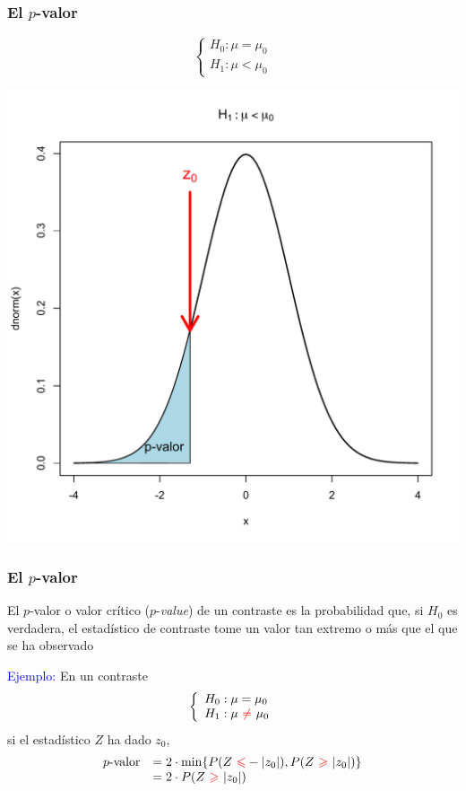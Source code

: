 \documentclass[12pt,t]{beamer}\usepackage[]{graphicx}\usepackage[]{color}
\newcommand{\red}[1]{\textcolor{red}{#1}}
\newcommand{\blue}[1]{\textcolor{blue}{#1}}
\renewcommand{\emph}[1]{{\color{red}#1}}
\renewcommand{\leq}{\leqslant}
\renewcommand{\geq}{\geqslant}
\theoremstyle{plain}
\theoremstyle{definition}
\begin{document}
\begin{frame}
\frametitle{El $p$-valor}
\vspace*{-0.75cm}

$$
\left\{\begin{array}{l}
H_{0}:\mu=\mu_{0}\\ H_{1}:\mu<\mu_{0}
\end{array}
\right.
$$
\begin{center}
\includegraphics[width=0.7\linewidth]{pvalor10.pdf}
\end{center}

\end{frame}


\begin{frame}
\frametitle{El $p$-valor}

El  \emph{$p$-valor} o  \emph{valor crítico}  ($p$-\textsl{value}) de un contraste es la probabilidad que, si $H_0$ es verdadera, el estadístico de contraste tome un valor tan extremo o  más que el que se ha observado
\medskip

\blue{Ejemplo:} En un contraste
$$
\left\{\begin{array}{l}
H_{0}:\mu=\mu_{0}\\ H_{1}:\mu\ \red{\neq}\ \mu_{0}
\end{array}
\right.
$$
si el estadístico $Z$ ha dado  $z_0$,
$$
\begin{array}{rl}
\mbox{$p$-valor} & =2\cdot \min\{P(Z\ \red{\leq} -|z_0|),P(Z\ \red{\geq}\ |z_0|)\}\\
 & =2\cdot P(Z\ \red{\geq}\ |z_0|)
\end{array}
$$
\end{frame}
\end{document}
